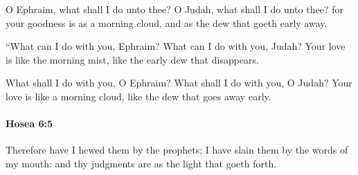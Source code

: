 			\begin{versebox}
					\item[BHS] 
					\item[LXX] 
					\item[ASV] O Ephraim, what shall I do unto thee? O Judah, what shall I do unto thee? for your goodness is as a morning cloud, and as the dew that goeth early away.
					\item[NIV] “What can I do with you, Ephraim? What can I do with you, Judah? Your love is like the morning mist, like the early dew that disappears.
					\item[NRSV] What shall I do with you, O Ephraim? What shall I do with you, O Judah? Your love is like a morning cloud, like the dew that goes away early.
			\end{versebox}

		\paragraph{Hosea 6:5} %
			\label{HOSEA-6-5}

			Therefore have I hewed them by the prophets; I have slain them by the words of my mouth: and thy judgments are as the light that goeth forth.

